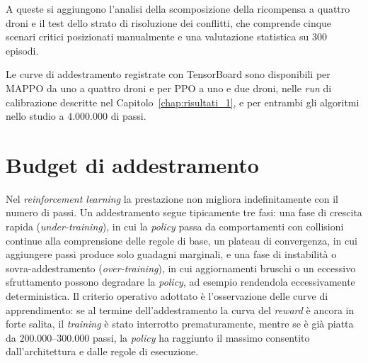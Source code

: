 \documentclass[12pt,a4paper,twoside]{report}
\newcommand{\fonte}[1][elaborazione propria]{\par\vspace{3pt}{\footnotesize\emph{Fonte: #1.}}}
\begin{document}
\begin{table}[htbp]
    \centering
    \caption{Configurazioni sperimentali.}
    \label{tab:5_1}
    \fonte
\end{table}

A queste si aggiungono l'analisi della scomposizione della ricompensa a quattro droni e il test dello strato di risoluzione dei conflitti, che comprende cinque scenari critici posizionati manualmente e una valutazione statistica su $300$ episodi.

Le curve di addestramento registrate con TensorBoard sono disponibili per MAPPO da uno a quattro droni e per PPO a uno e due droni, nelle \emph{run} di calibrazione descritte nel Capitolo~\ref{chap:risultati_1}, e per entrambi gli algoritmi nello studio a $4.000.000$ di passi.

\section{Budget di addestramento}
\label{sec:budget_addestramento}

Nel \emph{reinforcement learning} la prestazione non migliora indefinitamente con il numero di passi. Un addestramento segue tipicamente tre fasi: una fase di crescita rapida (\emph{under-training}), in cui la \emph{policy} passa da comportamenti con collisioni continue alla comprensione delle regole di base, un plateau di convergenza, in cui aggiungere passi produce solo guadagni marginali, e una fase di instabilità o sovra-addestramento (\emph{over-training}), in cui aggiornamenti bruschi o un eccessivo sfruttamento possono degradare la \emph{policy}, ad esempio rendendola eccessivamente deterministica. Il criterio operativo adottato è l'osservazione delle curve di apprendimento: se al termine dell'addestramento la curva del \emph{reward} è ancora in forte salita, il \emph{training} è stato interrotto prematuramente, mentre se è già piatta da $200.000$--$300.000$ passi, la \emph{policy} ha raggiunto il massimo consentito dall'architettura e dalle regole di esecuzione.
\end{document}
